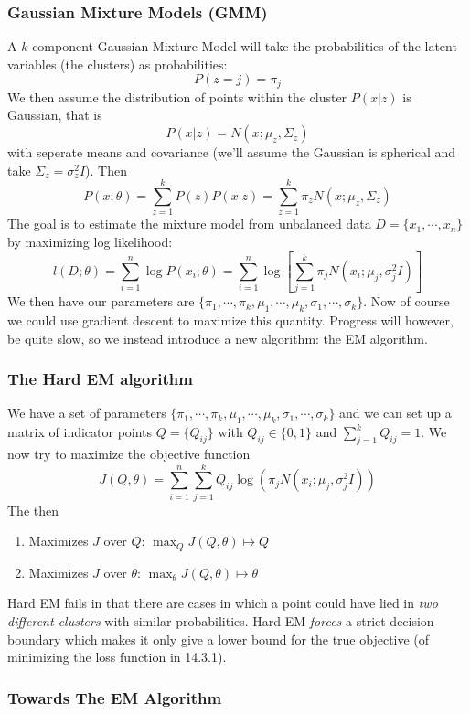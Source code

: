 \documentclass[11pt]{scrartcl}
\begin{document}
\subsubsection{Gaussian Mixture Models (GMM)}
A $k$-component Gaussian Mixture Model will take the probabilities of the latent variables (the clusters) as probabilities:
$$P(z=j)=\pi_{j}$$
We then assume the distribution of points within the cluster $P(x|z)$ is Gaussian, that is $$P(x|z)=N(x;\mu_{z},\Sigma_{z})$$
with seperate means and covariance (we'll assume the Gaussian is spherical and take $\Sigma_{z}=\sigma_{z}^2 I$). Then 
$$P(x;\theta)=\sum_{z=1}^{k}P(z)P(x|z)=\sum_{z=1}^{k}\pi_{z}N(x;\mu_{z},\Sigma_{z})$$
The goal is to estimate the mixture model from unbalanced data $D=\{x_1,\cdots,x_{n}\}$ by maximizing log likelihood: 
$$l(D;\theta)=\sum_{i=1}^{n}\log{P(x_i;\theta)} = \sum_{i=1}^{n}\log\left[\sum_{j=1}^{k}\pi_{j}N(x_i;\mu_{j},\sigma_j^2I)\right]$$
We then have our parameters are $\{\pi_1,\cdots,\pi_k,\mu_1,\cdots,\mu_k,\sigma_1,\cdots,\sigma_k\}$. Now of course we could use gradient descent to maximize this quantity. Progress will however, be quite slow, so we instead introduce a new algorithm: the EM algorithm. 

\subsubsection{The Hard EM algorithm}
We have a set of parameters $\{\pi_1,\cdots,\pi_k,\mu_1,\cdots,\mu_k,\sigma_1,\cdots,\sigma_k\}$ and we can set up a matrix of indicator points $Q=\{Q_{ij}\}$ with $Q_{ij} \in \{0,1\}$ and $\sum_{j=1}^{k}Q_{ij}=1$. We now try to maximize the objective function 
$$J(Q,\theta)=\sum_{i=1}^{n}\sum_{j=1}^{k}Q_{ij}\log\left(\pi_{j}N(x_{i};\mu_{j},\sigma_j^2I) \right)$$
The  then 
\begin{enumerate}[label=(\roman*)]
    \item Maximizes $J$ over $Q$: $\max_{Q}J(Q,\theta) \mapsto Q$
    \item Maximizes $J$ over $\theta$: $\max_{\theta}J(Q,\theta) \mapsto \theta$
\end{enumerate}
Hard EM fails in that there are cases in which a point could have lied in \textit{two different clusters} with similar probabilities. Hard EM \textit{forces} a strict decision boundary which makes it only give a lower bound for the true objective (of minimizing the loss function in 14.3.1).

\subsubsection{Towards The EM Algorithm}
\end{document}

